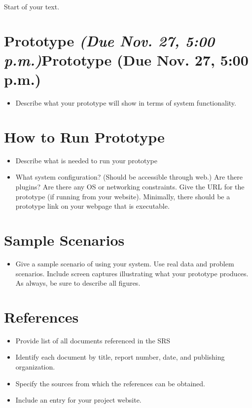 \documentclass[12pt]{article}
\begin{document}
Start of your text.

\section{{Prototype \emph{(Due Nov. 27, 5:00
p.m.)}}{Prototype (Due Nov. 27, 5:00 p.m.)}}\label{prototype-due-nov.-27-500-p.m.}

\begin{itemize}
\item
  Describe what your prototype will show in terms of system
  functionality.
\end{itemize}

\section{How to Run Prototype}\label{how-to-run-prototype}

\begin{itemize}
\item
  Describe what is needed to run your prototype
\item
  What system configuration? (Should be accessible through web.) Are
  there plugins? Are there any OS or networking constraints. Give the
  URL for the prototype (if running from your website). Minimally, there
  should be a prototype link on your webpage that is executable.
\end{itemize}

\section{Sample Scenarios}\label{sample-scenarios}

\begin{itemize}
\item
  Give a sample scenario of using your system. Use real data and problem
  scenarios. Include screen captures illustrating what your prototype
  produces. As always, be sure to describe all figures.
\end{itemize}

\section{References}\label{references}

\begin{itemize}
\item
  Provide list of all documents referenced in the SRS
\item
  Identify each document by title, report number, date, and publishing
  organization.
\item
  Specify the sources from which the references can be obtained.
\item
  Include an entry for your project website.
\end{itemize}
\end{document}
